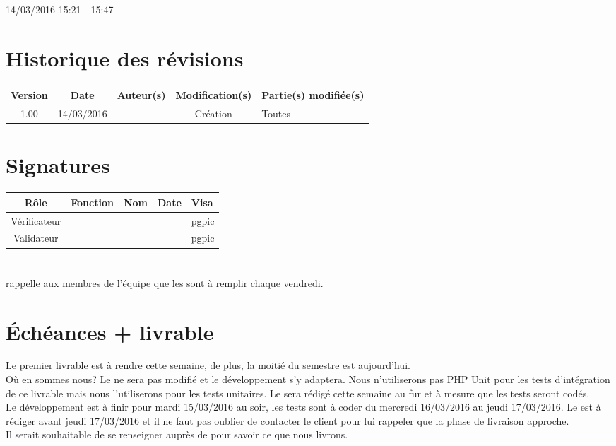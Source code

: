 \documentclass [a4paper] {article}
\begin{document}
14/03/2016			 				%
\hfill   
\hfill 	 15:21 - 15:47 				%



\section*{Historique des révisions}
\begin{center}
			\begin{tabular}{| c | c | c | c | p{4cm} |}
				\hline
				\rowcolor{Gray}
				Version & Date & Auteur(s) & Modification(s) & Partie(s) modifiée(s)		 \\
				\hline
				1.00 & 14/03/2016 & \Pierre & Création & Toutes \\
		\hline		
			\end{tabular}
		\end{center}

\section*{Signatures}

		\begin{center}
			\begin{tabular}{| c | c | c | c | p{4cm} |}
				\hline
				\rowcolor{Gray}
				Rôle & Fonction & Nom & Date & Visa		 \\
				\hline
				Vérificateur & \RQA & \Kafui &  & pgpic \\[30pt]
				\hline
				Validateur & \CP & \Sergi &  & pgpic \\[30pt]	
				\hline
			\end{tabular}
		\end{center}
		
\newpage		



\section{\FS}
\Sergi{} rappelle aux membres de l'équipe que les \FS{} sont à remplir chaque vendredi.

\section{Échéances + livrable}
Le premier livrable est à rendre cette semaine, de plus, la moitié du semestre est aujourd'hui. \\
Où en sommes nous? Le \PTI{} ne sera pas modifié et le développement s'y adaptera. Nous n'utiliserons pas PHP Unit pour les tests d'intégration de ce livrable mais nous l'utiliserons pour les tests unitaires. Le \PTU{} sera rédigé cette semaine au fur et à mesure que les tests seront codés. \\
Le développement est à finir pour mardi 15/03/2016 au soir, les tests sont à coder du mercredi 16/03/2016 au jeudi 17/03/2016. Le \CDR{} est à rédiger avant jeudi 17/03/2016 et il ne faut pas oublier de contacter le client pour lui rappeler que la phase de livraison approche. \\
Il serait souhaitable de se renseigner auprès de \nomTuteurPedago{} pour savoir ce que nous livrons.
\end{document}
